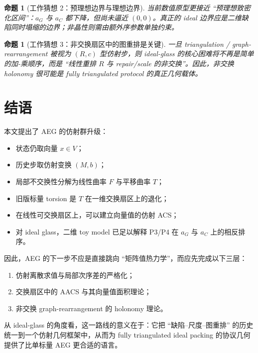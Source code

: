 \documentclass[11pt,a4paper]{ctexart}
\newtheorem{proposition}[definition]{命题}
\theoremstyle{remark}
\begin{document}
\begin{proposition}[工作猜想 2：预理想边界与理想边界]
当前数值原型更接近 ``预理想致密化区间''：$a_G$ 与 $a_C$ 都下降，但尚未逼近 $(0,0)$。真正的 ideal 边界应是二维缺陷同时塌缩的边界；非晶性则需由额外序参数单独约束。
\end{proposition}

\begin{proposition}[工作猜想 3：非交换扇区中的图重排是关键]
一旦 triangulation / graph-rearrangement 被视为 $(R,c)$ 型仿射步，则 ideal-glass 的核心困难将不再是简单的加-乘顺序，而是 ``线性重排 $R$ 与 repair/scale 的非交换''。因此，非交换 holonomy 很可能是 fully triangulated protocol 的真正几何载体。
\end{proposition}

\section{结语}

本文提出了 AEG 的仿射群升级：
\begin{itemize}
    \item 状态仍取向量 $x\in V$；
    \item 历史步取仿射变换 $(M,b)$；
    \item 局部不交换性分解为线性曲率 $F$ 与平移曲率 $T$；
    \item 旧版标量 torsion 是 $T$ 在一维交换扇区上的退化；
    \item 在线性可交换扇区上，可以建立向量值的仿射 ACS；
    \item 对 ideal glass，二维 toy model 已足以解释 P3/P4 在 $a_G$ 与 $a_C$ 上的相反排序。
\end{itemize}

因此，AEG 的下一步不应是直接跳向 ``矩阵值热力学''，而应先完成以下三层：
\begin{enumerate}[label=(\arabic*)]
    \item 仿射离散求值与局部次序差的严格化；
    \item 交换扇区中的 AACS 与其向量值面积理论；
    \item 非交换 graph-rearrangement 的 holonomy 理论。
\end{enumerate}

从 ideal-glass 的角度看，这一路线的意义在于：它把 ``缺陷--尺度--图重排'' 的历史统一到一个仿射几何框架中，从而为 fully triangulated ideal packing 的协议几何提供了比单标量 AEG 更合适的语言。
\end{document}
